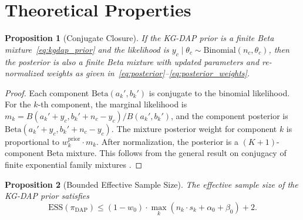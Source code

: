 \documentclass[12pt]{article}
\newtheorem{proposition}{Proposition}
\newcommand{\thetac}{\theta_c}
\newcommand{\piDAP}{\pi_{\mathrm{DAP}}}
\newcommand{\ESS}{\mathrm{ESS}}
\begin{document}
\section{Theoretical Properties}
\label{sec:theory}

\begin{proposition}[Conjugate Closure]
\label{prop:conjugate}
If the KG-DAP prior is a finite Beta mixture~\eqref{eq:kgdap_prior} and the likelihood is $y_c \mid \thetac \sim \mathrm{Binomial}(n_c, \thetac)$, then the posterior is also a finite Beta mixture with updated parameters and re-normalized weights as given in~\eqref{eq:posterior}--\eqref{eq:posterior_weights}.
\end{proposition}

\begin{proof}
Each component $\mathrm{Beta}(a_k', b_k')$ is conjugate to the binomial likelihood. For the $k$-th component, the marginal likelihood is $m_k = B(a_k' + y_c, b_k' + n_c - y_c) / B(a_k', b_k')$, and the component posterior is $\mathrm{Beta}(a_k' + y_c, b_k' + n_c - y_c)$. The mixture posterior weight for component $k$ is proportional to $w_k^{\mathrm{prior}} \cdot m_k$. After normalization, the posterior is a $(K+1)$-component Beta mixture. This follows from the general result on conjugacy of finite exponential family mixtures \citep{diaconis1979conjugate}.
\end{proof}

\begin{proposition}[Bounded Effective Sample Size]
\label{prop:ess_bound}
The effective sample size of the KG-DAP prior satisfies
\begin{equation}
\ESS(\piDAP) \leq (1 - w_0) \cdot \max_{k} (n_k \cdot s_k + \alpha_0 + \beta_0) + 2.
\label{eq:ess_bound}
\end{equation}
\end{proposition}
\end{document}
